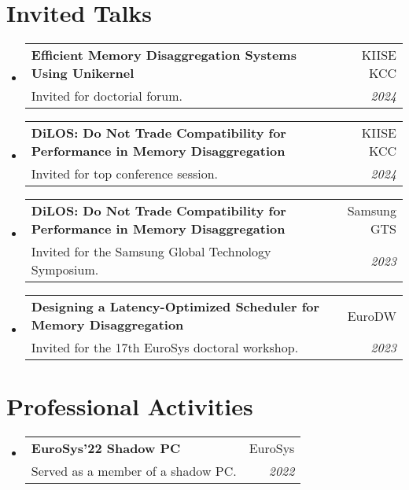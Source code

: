 \documentclass[letterpaper,11pt]{article}
\makeatletter
\newcommand{\resumeSubheading}[4]{
  \vspace{-1pt}\item
    \begin{tabular*}{0.97\textwidth}[t]{l@{\extracolsep{\fill}}r}
      \textbf{#1} & #2 \\
      {\small#3} & \textit{\small #4} \\
    \end{tabular*}\vspace{-5pt}
}
\newcommand{\resumeSubHeadingListStart}{\begin{itemize}[leftmargin=*]}
\newcommand{\resumeSubHeadingListEnd}{\end{itemize}}
\makeatother
\begin{document}
\section{Invited Talks}
\resumeSubHeadingListStart
\resumeSubheading{Efficient Memory Disaggregation Systems Using Unikernel}{KIISE KCC}{Invited for doctorial forum.}{2024}
\resumeSubheading{DiLOS: Do Not Trade Compatibility for Performance in Memory Disaggregation}{KIISE KCC}{Invited for top conference session.}{2024}
\resumeSubheading{DiLOS: Do Not Trade Compatibility for Performance in Memory Disaggregation}{Samsung GTS}{Invited for the Samsung Global Technology Symposium.}{2023}
\resumeSubheading{Designing a Latency-Optimized Scheduler for Memory Disaggregation}{EuroDW}{Invited for the 17th EuroSys doctoral workshop.}{2023}
\resumeSubHeadingListEnd

\section{Professional Activities}
\resumeSubHeadingListStart
\resumeSubheading{EuroSys'22 Shadow PC}{EuroSys}{Served as a member of a shadow PC.}{2022}
\resumeSubHeadingListEnd


\end{document}
